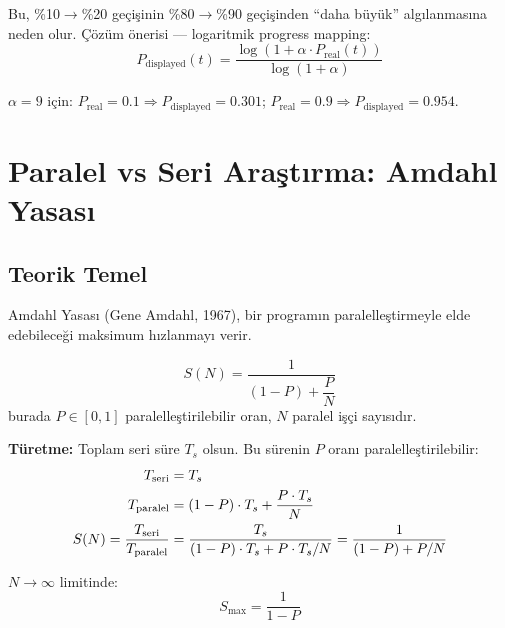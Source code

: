 Bu, \%10$\to$\%20 ge\c{c}i\c{s}inin \%80$\to$\%90 ge\c{c}i\c{s}inden ``daha b\"{u}y\"{u}k'' alg{\i}lanmas{\i}na neden olur. \c{C}\"{o}z\"{u}m \"{o}nerisi --- logaritmik progress mapping:
\begin{equation}
\label{eq:log_progress}
P_{\text{displayed}}(t) = \frac{\log(1 + \alpha \cdot P_{\text{real}}(t))}{\log(1 + \alpha)}
\end{equation}

\begin{ornek}
$\alpha = 9$ i\c{c}in: $P_{\text{real}} = 0.1 \Rightarrow P_{\text{displayed}} = 0.301$; \quad $P_{\text{real}} = 0.9 \Rightarrow P_{\text{displayed}} = 0.954$.
\end{ornek}


\section{Paralel vs Seri Ara\c{s}t{\i}rma: Amdahl Yasas{\i}}
\label{sec:pipe-amdahl}

\subsection{Teorik Temel}

Amdahl Yasas{\i} (Gene Amdahl, 1967), bir program{\i}n paralelle\c{s}tirmeyle elde edebilece\u{g}i maksimum h{\i}zlanmay{\i} verir.

\begin{formulbox}
\begin{equation}
\label{eq:pipe-amdahl}
S(N) = \frac{1}{(1 - P) + \dfrac{P}{N}}
\end{equation}
burada $P \in [0,1]$ paralelle\c{s}tirilebilir oran, $N$ paralel i\c{s}\c{c}i say{\i}s{\i}d{\i}r.

\textbf{T\"{u}retme:} Toplam seri s\"{u}re $T_s$ olsun. Bu s\"{u}renin $P$ oran{\i} paralelle\c{s}tirilebilir:
\begin{align}
T_{\text{seri}} &= T_s \notag \\
T_{\text{paralel}} &= (1-P) \cdot T_s + \frac{P \cdot T_s}{N} \notag \\
S(N) = \frac{T_{\text{seri}}}{T_{\text{paralel}}} &= \frac{T_s}{(1-P) \cdot T_s + P \cdot T_s / N} = \frac{1}{(1-P) + P/N} \label{eq:amdahl_derivation}
\end{align}

$N \to \infty$ limitinde:
\begin{equation}
\label{eq:amdahl_limit}
S_{\max} = \frac{1}{1 - P}
\end{equation}
\end{formulbox}

